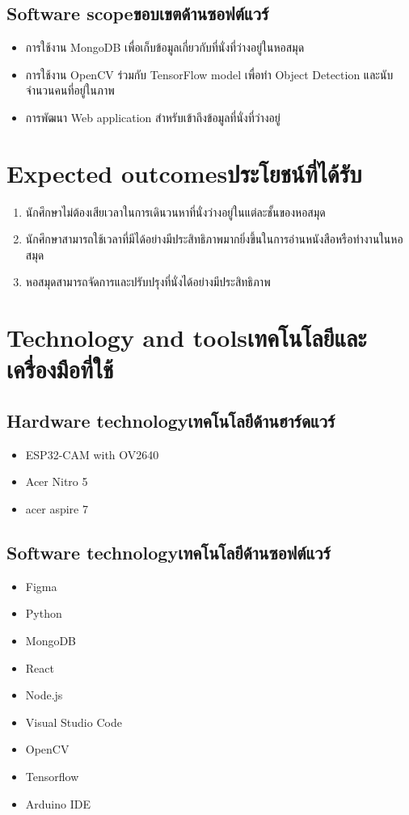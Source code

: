 \subsection{\ifenglish Software scope\else ขอบเขตด้านซอฟต์แวร์\fi}
\begin{itemize}
    \item การใช้งาน MongoDB เพื่อเก็บข้อมูลเกี่ยวกับที่นั่งที่ว่างอยู่ในหอสมุด
    \item การใช้งาน OpenCV ร่วมกับ TensorFlow model เพื่อทำ Object Detection และนับจำนวนคนที่อยู่ในภาพ
    \item การพัฒนา Web application สำหรับเข้าถึงข้อมูลที่นั่งที่ว่างอยู่
\end{itemize}

\section{\ifenglish Expected outcomes\else ประโยชน์ที่ได้รับ\fi}
\begin{enumerate}
   \item นักศึกษาไม่ต้องเสียเวลาในการเดินวนหาที่นั่งว่างอยู่ในแต่ละชั้นของหอสมุด
   \item นักศึกษาสามารถใช้เวลาที่มีได้อย่างมีประสิทธิภาพมากยิ่งขึ้นในการอ่านหนังสือหรือทำงานในหอสมุด
   \item หอสมุดสามารถจัดการและปรับปรุงที่นั่งได้อย่างมีประสิทธิภาพ 
\end{enumerate}
\section{\ifenglish Technology and tools\else เทคโนโลยีและเครื่องมือที่ใช้\fi}

\subsection{\ifenglish Hardware technology\else เทคโนโลยีด้านฮาร์ดแวร์\fi}
\begin{itemize}
    \item ESP32-CAM with OV2640
    \item Acer Nitro 5
    \item acer aspire 7
\end{itemize}
\subsection{\ifenglish Software technology\else เทคโนโลยีด้านซอฟต์แวร์\fi}
\begin{itemize}
    \item Figma
    \item Python
    \item MongoDB
    \item React
    \item Node.js
    \item Visual Studio Code
    \item OpenCV
    \item Tensorflow
    \item Arduino IDE    
\end{itemize}
